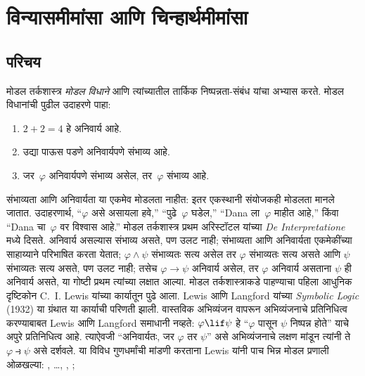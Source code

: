 \chapter{विन्यासमीमांसा आणि चिन्हार्थमीमांसा}\label{nml:syn:chap}
\section{परिचय}\label{nml:syn:int:sec}
मोडल तर्कशास्त्र \emph{मोडल विधाने} आणि त्यांच्यातील तार्किक
निष्पन्नता-संबंध यांचा अभ्यास करते. मोडल विधानांची पुढील
उदाहरणे पाहा:
\begin{enumerate}
\item $2+2=4$ हे अनिवार्य आहे.
\item उद्या पाऊस पडणे अनिवार्यपणे संभाव्य आहे.
\item जर~$\varphi$ अनिवार्यपणे संभाव्य असेल, तर~$\varphi$ संभाव्य आहे.
\end{enumerate}
संभाव्यता आणि अनिवार्यता या एकमेव मोडलता नाहीत: इतर एकस्थानी
संयोजकही मोडलता मानले जातात. उदाहरणार्थ, ``$\varphi$ असे असायला हवे,''
``पुढे~$\varphi$ घडेल,'' ``Dana ला~$\varphi$ माहीत आहे,'' किंवा
``Dana चा~$\varphi$ वर विश्वास आहे.''
मोडल तर्कशास्त्र प्रथम अरिस्टॉटल यांच्या \emph{De
  Interpretatione} मध्ये दिसते. अनिवार्य असल्यास संभाव्य असते,
पण उलट नाही; संभाव्यता आणि अनिवार्यता एकमेकींच्या साहाय्याने
परिभाषित करता येतात; $\varphi \land \psi$ संभाव्यतः सत्य असेल तर
$\varphi$ संभाव्यतः सत्य असते आणि $\psi$ संभाव्यतः सत्य असते,
पण उलट नाही; तसेच $\varphi \to \psi$ अनिवार्य असेल, तर $\varphi$
अनिवार्य असताना $\psi$ ही अनिवार्य असते, या गोष्टी प्रथम
त्यांच्या लक्षात आल्या.
मोडल तर्कशास्त्राकडे पाहण्याचा पहिला आधुनिक दृष्टिकोन
C.~I. Lewis यांच्या कार्यातून पुढे आला. Lewis आणि Langford
यांच्या \emph{Symbolic Logic} (1932) या ग्रंथात या कार्याची
परिणती झाली. वास्तविक अभिव्यंजन वापरून अभिव्यंजनाचे प्रतिनिधित्व
करण्याबाबत Lewis आणि Langford समाधानी नव्हते: $\varphi \lif \psi$
हे ``$\varphi$ पासून $\psi$ निष्पन्न होते'' याचे अपुरे प्रतिनिधित्व आहे.
त्याऐवजी ``अनिवार्यतः, जर $\varphi$ तर $\psi$'' असे अभिव्यंजनाचे
लक्षण मांडून त्यांनी ते $\varphi \strictif \psi$ असे दर्शवले.
या विविध गुणधर्मांची मांडणी करताना Lewis यांनी पाच भिन्न
मोडल प्रणाली ओळखल्या: , \ldots, , ;
